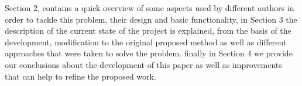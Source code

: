 \documentclass[conference]{IEEEtran}
\begin{document}



Section 2, contains a quick overview of some aspects used by different authors
in order to tackle this problem, their design and basic functionality, in
Section 3 the description of the current state of the project is explained, from
the basis of the development, modification to the original proposed method as 
well as different approaches that were taken to solve the problem.
finally in Section 4 we provide our conclusions about the development of this
paper as well as improvements that can help to refine the proposed work. 

 


%


\end{document}
